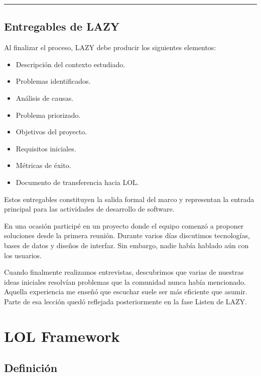 \documentclass[14pt,a4paper,oneside]{extbook}
\begin{document}
\par\vspace{1.5em}\noindent\hfill\rule{0.25\textwidth}{0.6pt}\hfill\par\vspace{1.5em}

\section{Entregables de LAZY}

Al finalizar el proceso, LAZY debe producir los siguientes elementos:

\begin{itemize}
\item Descripción del contexto estudiado.
\item Problemas identificados.
\item Análisis de causas.
\item Problema priorizado.
\item Objetivos del proyecto.
\item Requisitos iniciales.
\item Métricas de éxito.
\item Documento de transferencia hacia LOL.
\end{itemize}

Estos entregables constituyen la salida formal del marco y representan la entrada principal para las actividades de desarrollo de software.

\begin{authorobservation}
En una ocasión participé en un proyecto donde el equipo comenzó a proponer soluciones desde la primera reunión. Durante varios días discutimos tecnologías, bases de datos y diseños de interfaz. Sin embargo, nadie había hablado aún con los usuarios.

Cuando finalmente realizamos entrevistas, descubrimos que varias de nuestras ideas iniciales resolvían problemas que la comunidad nunca había mencionado. Aquella experiencia me enseñó que escuchar suele ser más eficiente que asumir. Parte de esa lección quedó reflejada posteriormente en la fase Listen de LAZY.
\end{authorobservation}



\chapter{LOL Framework}

\section{Definición}
\end{document}
